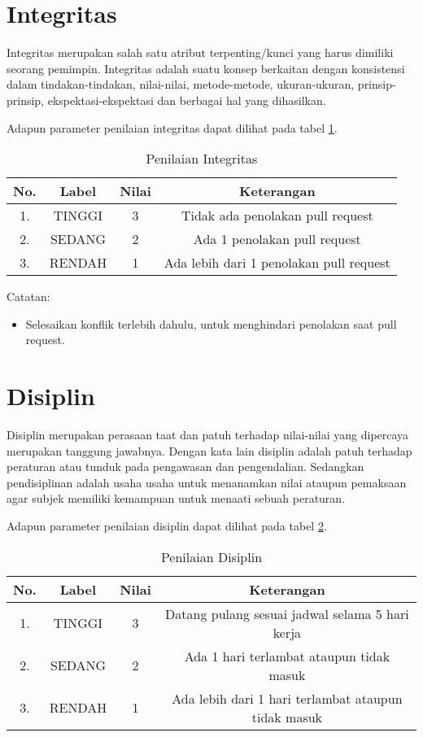 \section{Integritas}
Integritas merupakan salah satu atribut terpenting/kunci yang harus dimiliki seorang pemimpin. Integritas adalah suatu konsep berkaitan dengan konsistensi dalam tindakan-tindakan, nilai-nilai, metode-metode, ukuran-ukuran, prinsip-prinsip, ekspektasi-ekspektasi dan berbagai hal yang dihasilkan.

Adapun parameter penilaian integritas dapat dilihat pada tabel \ref{tab:nilaiintegritas}.

\begin{table}[H]
\caption{Penilaian Integritas}
\centering
\begin{tabular}{|c|c|c|c|}
\hline
\textbf{No.}&\textbf{Label}&\textbf{Nilai}&\textbf{Keterangan}\\
\hline
1.&TINGGI&3&Tidak ada penolakan pull request\\
\hline
2.&SEDANG&2&Ada 1 penolakan pull request\\
\hline
3.&RENDAH&1&Ada lebih dari 1 penolakan pull request\\
\hline
\end{tabular}
\label{tab:nilaiintegritas}
\end{table}

Catatan:
\begin{itemize}
\item Selesaikan konflik terlebih dahulu, untuk menghindari penolakan saat pull request.
\end{itemize}

\section{Disiplin}
Disiplin merupakan perasaan taat dan patuh terhadap nilai-nilai yang dipercaya merupakan tanggung jawabnya. Dengan kata lain disiplin adalah patuh terhadap peraturan atau tunduk pada pengawasan dan pengendalian. Sedangkan pendisiplinan adalah usaha usaha untuk menanamkan nilai ataupun pemaksaan agar subjek memiliki kemampuan untuk menaati sebuah peraturan.

Adapun parameter penilaian disiplin dapat dilihat pada tabel \ref{tab:nilaidisiplin}.

\begin{table}[H]
\caption{Penilaian Disiplin}
\centering
\begin{tabular}{|c|c|c|c|}
\hline
\textbf{No.}&\textbf{Label}&\textbf{Nilai}&\textbf{Keterangan}\\
\hline
1.&TINGGI&3&Datang pulang sesuai jadwal selama 5 hari kerja\\
\hline
2.&SEDANG&2&Ada 1 hari terlambat ataupun tidak masuk\\
\hline
3.&RENDAH&1&Ada lebih dari 1 hari terlambat ataupun tidak masuk\\
\hline
\end{tabular}
\label{tab:nilaidisiplin}
\end{table}

